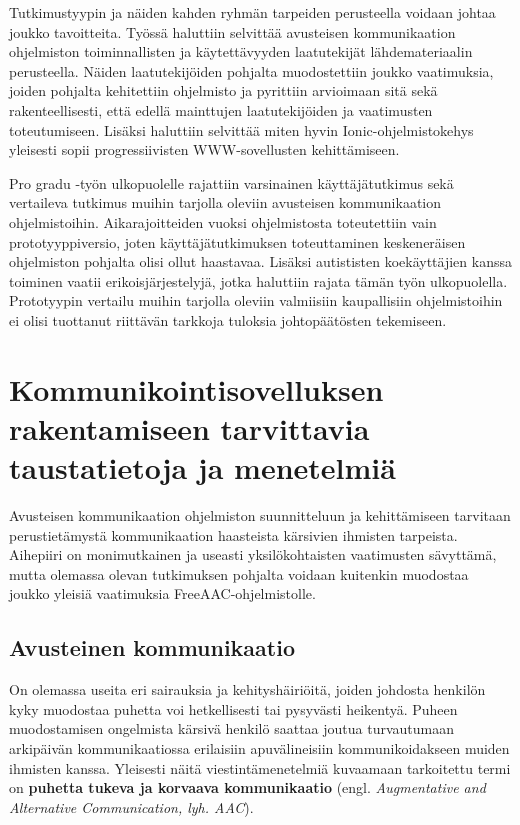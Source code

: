 \documentclass[utf8]{gradu3}
\begin{document}
Tutkimustyypin ja näiden kahden ryhmän tarpeiden perusteella voidaan johtaa joukko tavoitteita. Työssä haluttiin selvittää avusteisen kommunikaation ohjelmiston toiminnallisten ja käytettävyyden laatutekijät lähdemateriaalin perusteella. Näiden laatutekijöiden pohjalta muodostettiin joukko vaatimuksia, joiden pohjalta kehitettiin ohjelmisto ja pyrittiin arvioimaan sitä sekä rakenteellisesti, että edellä mainttujen laatutekijöiden ja vaatimusten toteutumiseen. Lisäksi haluttiin selvittää miten hyvin Ionic-ohjelmistokehys yleisesti sopii progressiivisten WWW-sovellusten kehittämiseen.

Pro gradu -työn ulkopuolelle rajattiin varsinainen käyttäjätutkimus sekä vertaileva tutkimus muihin tarjolla oleviin avusteisen kommunikaation ohjelmistoihin. Aikarajoitteiden vuoksi ohjelmistosta toteutettiin vain prototyyppiversio, joten käyttäjätutkimuksen toteuttaminen keskeneräisen ohjelmiston pohjalta olisi ollut haastavaa. Lisäksi autististen koekäyttäjien kanssa toiminen vaatii erikoisjärjestelyjä, jotka haluttiin rajata tämän työn ulkopuolella. Prototyypin vertailu muihin tarjolla oleviin valmiisiin kaupallisiin ohjelmistoihin ei olisi tuottanut riittävän tarkkoja tuloksia johtopäätösten tekemiseen.

\chapter{Kommunikointisovelluksen rakentamiseen tarvittavia taustatietoja ja menetelmiä}

Avusteisen kommunikaation ohjelmiston suunnitteluun ja kehittämiseen tarvitaan perustietämystä kommunikaation haasteista kärsivien ihmisten tarpeista. Aihepiiri on monimutkainen ja useasti yksilökohtaisten vaatimusten sävyttämä, mutta olemassa olevan tutkimuksen pohjalta voidaan kuitenkin muodostaa joukko yleisiä vaatimuksia FreeAAC-ohjelmistolle.

\section{Avusteinen kommunikaatio}

On olemassa useita eri sairauksia ja kehityshäiriöitä, joiden johdosta henkilön kyky muodostaa puhetta voi hetkellisesti tai pysyvästi heikentyä. Puheen muodostamisen ongelmista kärsivä henkilö saattaa joutua turvautumaan arkipäivän kommunikaatiossa erilaisiin apuvälineisiin kommunikoidakseen muiden ihmisten kanssa. Yleisesti näitä viestintämenetelmiä kuvaamaan tarkoitettu termi on \textbf{puhetta tukeva ja korvaava kommunikaatio} (engl. \textit{Augmentative and Alternative Communication, lyh. AAC}).
\end{document}
